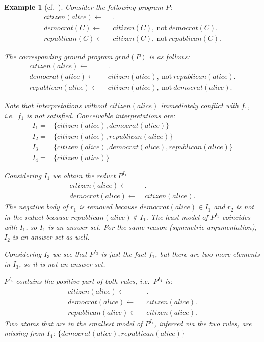 \documentclass{vutinfth} %
\newtheorem{example}{Example}[chapter]
\newcommand{\fail}{\mathrm{not } \ \xspace}
\newcommand{\from}{\ensuremath{\leftarrow}}
\begin{document}
\begin{example}[{cf.~\cite[Example 16]{DBLP:conf/rweb/EiterIK09}}]
Consider the following program $P$:
\begin{align*}
citizen(alice)\from& \ .\\
democrat(C) \from& \ citizen(C),~\fail democrat(C).\\
republican(C) \from& \ citizen(C),~\fail republican(C).
\end{align*}

The corresponding ground program $grnd(P)$ is as follows:
\begin{align}
citizen(alice)\from& \ . \tag{$f_1$} \\
democrat(alice) \from& \ citizen(alice),~\fail republican(alice). \tag{$r_1$} \\
republican(alice) \from& \ citizen(alice),~\fail democrat(alice). \tag{$r_2$} 
\end{align}

Note that interpretations without $citizen(alice)$ immediately conflict with $f_1$, i.e.~$f_1$ is not satisfied. Conceivable interpretations are:
\begin{align*}
I_1 =& \{ citizen(alice), democrat(alice) \}\\
I_2 =& \{ citizen(alice), republican(alice) \}\\
I_3 =& \{ citizen(alice), democrat(alice), republican(alice) \}\\
I_4 =& \{ citizen(alice) \}
\end{align*}

Considering $I_1$ we obtain the reduct $P^{I_1}$
\begin{align*}
citizen(alice)\from& \ .\\
democrat(alice) \from& \ citizen(alice).
\end{align*}
The negative body of $r_1$ is removed because $democrat(alice) \in I_1$ and $r_2$ is not in the reduct because $republican(alice) \not \in I_1$. The least model of $P^{I_1}$ coincides with $I_1$, so $I_1$ is an answer set. For the same reason (symmetric argumentation), $I_2$ is an answer set as well.

Considering $I_3$ we see that $P^{I_3}$ is just the fact $f_1$, but there are two more elements in $I_3$, so it is not an answer set.

$P^{I_4}$ contains the positive part of both rules, i.e.~$P^{I_4}$ is:
\begin{align*}
citizen(alice)\from& \ . \\
democrat(alice) \from& \ citizen(alice). \\
republican(alice) \from& \ citizen(alice).
\end{align*}
Two atoms that are in the smallest model of $P^{I_4}$, inferred via the two rules, are missing from $I_4$: $\{democrat(alice), republican(alice) \}$
\end{example}
\end{document}
